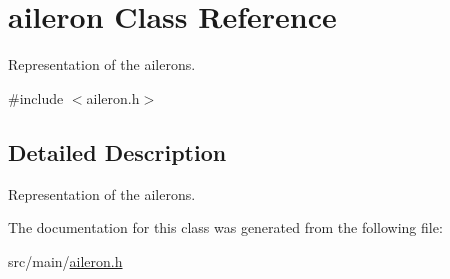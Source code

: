 \hypertarget{classaileron}{}\section{aileron Class Reference}
\label{classaileron}


Representation of the ailerons.  




{\ttfamily \#include $<$aileron.\+h$>$}



\subsection{Detailed Description}
Representation of the ailerons. 

The documentation for this class was generated from the following file\+:\begin{DoxyCompactItemize}
\item 
src/main/\hyperlink{aileron_8h}{aileron.\+h}\end{DoxyCompactItemize}
